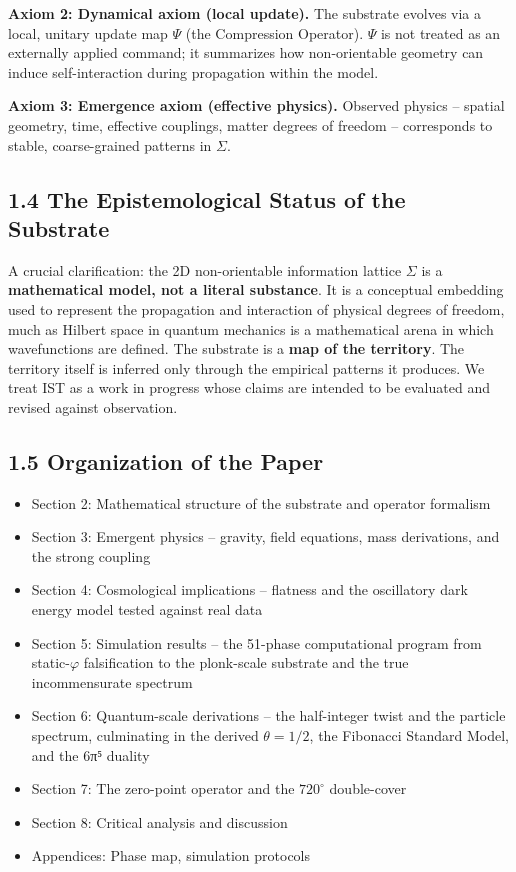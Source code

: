 \documentclass[
  11pt,
]{article}
\providecommand{\tightlist}{%
  \setlength{\itemsep}{0pt}\setlength{\parskip}{0pt}}
\begin{document}
\textbf{Axiom 2: Dynamical axiom (local update).} The substrate evolves
via a local, unitary update map \(\Psi\) (the Compression Operator).
\(\Psi\) is not treated as an externally applied command; it summarizes
how non-orientable geometry can induce self-interaction during
propagation within the model.

\textbf{Axiom 3: Emergence axiom (effective physics).} Observed physics
-- spatial geometry, time, effective couplings, matter degrees of
freedom -- corresponds to stable, coarse-grained patterns in \(\Sigma\).

\subsection{1.4 The Epistemological Status of the
Substrate}\label{the-epistemological-status-of-the-substrate}

A crucial clarification: the 2D non-orientable information lattice
\(\Sigma\) is a \textbf{mathematical model, not a literal substance}. It
is a conceptual embedding used to represent the propagation and
interaction of physical degrees of freedom, much as Hilbert space in
quantum mechanics is a mathematical arena in which wavefunctions are
defined. The substrate is a \textbf{map of the territory}. The territory
itself is inferred only through the empirical patterns it produces. We
treat IST as a work in progress whose claims are intended to be
evaluated and revised against observation.

\subsection{1.5 Organization of the
Paper}\label{organization-of-the-paper}

\begin{itemize}
\tightlist
\item
  Section 2: Mathematical structure of the substrate and operator
  formalism
\item
  Section 3: Emergent physics -- gravity, field equations, mass
  derivations, and the strong coupling
\item
  Section 4: Cosmological implications -- flatness and the oscillatory
  dark energy model tested against real data
\item
  Section 5: Simulation results -- the 51-phase computational program
  from static-\(\varphi\) falsification to the plonk-scale substrate and
  the true incommensurate spectrum
\item
  Section 6: Quantum-scale derivations -- the half-integer twist and the
  particle spectrum, culminating in the derived \(\theta = 1/2\), the
  Fibonacci Standard Model, and the 6π⁵ duality
\item
  Section 7: The zero-point operator and the \(720^{\circ}\)
  double-cover
\item
  Section 8: Critical analysis and discussion
\item
  Appendices: Phase map, simulation protocols
\end{itemize}
\end{document}
